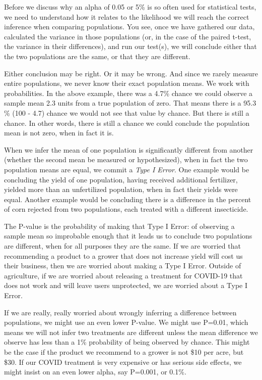 \documentclass[
]{book}
\begin{document}
Before we discuss why an alpha of 0.05 or 5\% is so often used for statistical tests, we need to understand how it relates to the likelihood we will reach the correct inference when comparing populations. You see, once we have gathered our data, calculated the variance in those populations (or, in the case of the paired t-test, the variance in their differences), and run our test(s), we will conclude either that the two populations are the same, or that they are different.

Either conclusion may be right. Or it may be wrong. And since we rarely measure entire populations, we never know their exact population means. We work with probabilities. In the above example, there was a 4.7\% chance we could observe a sample mean 2.3 units from a true population of zero. That means there is a 95.3 \% (100 - 4.7) chance we would not see that value by chance. But there is still a chance. In other words, there is still a chance we could conclude the population mean is not zero, when in fact it is.

When we infer the mean of one population is significantly different from another (whether the second mean be measured or hypothesized), when in fact the two population means are equal, we commit a \emph{Type I Error}. One example would be concluding the yield of one population, having received additional fertilizer, yielded more than an unfertilized population, when in fact their yields were equal. Another example would be concluding there is a difference in the percent of corn rejected from two populations, each treated with a different insecticide.

The P-value is the probability of making that Type I Error: of observing a sample mean so improbable enough that it leads us to conclude two populations are different, when for all purposes they are the same. If we are worried that recommending a product to a grower that does not increase yield will cost us their business, then we are worried about making a Type I Error. Outside of agriculture, if we are worried about releasing a treatment for COVID-19 that does not work and will leave users unprotected, we are worried about a Type I Error.

If we are really, really worried about wrongly inferring a difference between populations, we might use an even lower P-value. We might use P=0.01, which means we will not infer two treatments are different unless the mean difference we observe has less than a 1\% probability of being observed by chance. This might be the case if the product we recommend to a grower is not \$10 per acre, but \$30. If our COVID treatment is very expensive or has serious side effects, we might insist on an even lower alpha, say P=0.001, or 0.1\%.
\end{document}
